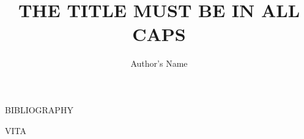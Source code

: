 \documentclass[12pt]{olemissthesis}
\title{THE TITLE MUST BE IN ALL CAPS}
\author{Author's Name} %
\numberwithin{equation}{section}
\begin{document}
\makefrontmatter
\normalem %


%



\singlespacing


\cleardoublepage
\ifdefined{}
\else
\fi
{}

\newpage
{}
\vspace*{\fill}
\begin{center}\normalfont\normalsize{BIBLIOGRAPHY}\end{center}
\vspace*{\fill}

\newpage
\begingroup
  \def\chapter*#1{}
{}

\endgroup


\cleardoublepage
\doublespacing
\ifdefined{}
\else
\fi
{}
\vspace*{.8in} %
\begin{center}
VITA
\end{center}
\vspace{.15in}

\end{document}
